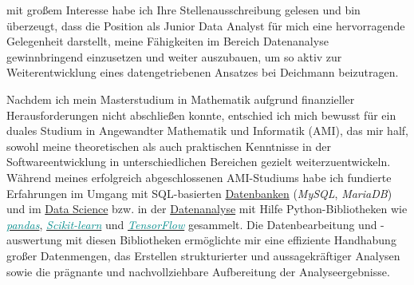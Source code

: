 mit großem Interesse habe ich Ihre Stellenausschreibung gelesen und bin überzeugt, dass die Position als Junior Data Analyst für mich eine hervorragende Gelegenheit darstellt, meine Fähigkeiten im Bereich Datenanalyse gewinnbringend einzusetzen und weiter auszubauen, um so aktiv zur Weiterentwicklung eines datengetriebenen Ansatzes bei Deichmann beizutragen.

Nachdem ich mein Masterstudium in Mathematik aufgrund finanzieller Herausforderungen nicht abschließen konnte, entschied ich mich bewusst für ein duales Studium in Angewandter Mathematik und Informatik (AMI), das mir half, sowohl meine theoretischen als auch praktischen Kenntnisse in der Softwareentwicklung in unterschiedlichen Bereichen gezielt weiterzuentwickeln.\\
Während meines erfolgreich abgeschlossenen AMI-Studiums habe ich fundierte Erfahrungen im Umgang mit SQL-basierten \href{https://github.com/montahaee/DB/tree/master/ex_am_cise/docker}{\textcolor{darkgreencyan}{Datenbanken}} (\textit{MySQL}, \textit{MariaDB}) und im \href{https://github.com/montahaee/DS}{\textcolor{darkgreencyan}{Data Science}}
bzw. in der \href{https://montahaee.github.io/assets/pdf/en/projects/heart_disease_Prediction.pdf}{\textcolor{darkgreencyan}{Datenanalyse}} mit Hilfe Python-Bibliotheken wie \href{https://de.wikipedia.org/wiki/Pandas_(Software)}{\textit{\textcolor{darkcyan}{pandas}}}, \href{https://de.wikipedia.org/wiki/Scikit-learn}{\textit{\textcolor{darkcyan}{Scikit-learn}}} und  \href{https://de.wikipedia.org/wiki/TensorFlow}{\textit{\textcolor{darkcyan}{TensorFlow}}} gesammelt.
Die Datenbearbeitung und -auswertung mit diesen Bibliotheken ermöglichte mir eine effiziente Handhabung großer Datenmengen, das Erstellen strukturierter und aussagekräftiger Analysen sowie die prägnante und nachvollziehbare Aufbereitung der Analyseergebnisse.

